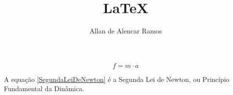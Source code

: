 \documentclass[12pt, a4paper]{article}
\begin{document}
\title{LaTeX}
\author{Allan de Alencar Ramos}
\maketitle

\begin{equation} \label{SegundaLeiDeNewton}
f = m \cdot a
\end{equation}

A equação \ref{SegundaLeiDeNewton} é a Segunda Lei de Newton, ou Princípio Fundamental da Dinâmica.
\end{document}
